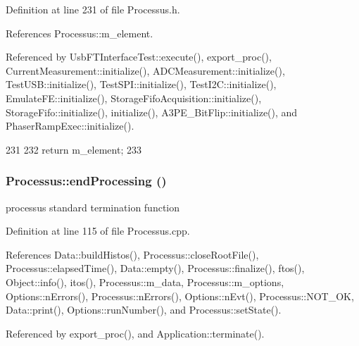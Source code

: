 Definition at line 231 of file Processus.h.

References Processus::m\_\-element.

Referenced by UsbFTInterfaceTest::execute(), export\_\-proc(), CurrentMeasurement::initialize(), ADCMeasurement::initialize(), TestUSB::initialize(), TestSPI::initialize(), TestI2C::initialize(), EmulateFE::initialize(), StorageFifoAcquisition::initialize(), StorageFifo::initialize(), initialize(), A3PE\_\-BitFlip::initialize(), and PhaserRampExec::initialize().


\begin{DoxyCode}
231                       {
232     return m_element;
233   }
\end{DoxyCode}
\hypertarget{classProcessus_a5e4da662989d356b89d490b89c7afbfd}{
\subsubsection[{endProcessing}]{ Processus::endProcessing ()}}
\label{classProcessus_a5e4da662989d356b89d490b89c7afbfd}
processus standard termination function 

Definition at line 115 of file Processus.cpp.

References Data::buildHistos(), Processus::closeRootFile(), Processus::elapsedTime(), Data::empty(), Processus::finalize(), ftos(), Object::info(), itos(), Processus::m\_\-data, Processus::m\_\-options, Options::nErrors(), Processus::nErrors(), Options::nEvt(), Processus::NOT\_\-OK, Data::print(), Options::runNumber(), and Processus::setState().

Referenced by export\_\-proc(), and Application::terminate().


